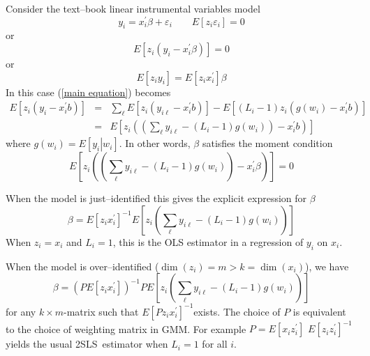 \documentclass[12pt]{article}
\begin{document}
Consider the text--book linear instrumental variables model
\begin{equation*}
y_{i}=x_{i}^{\prime }\beta +\varepsilon _{i}\qquad E\left[ z_{i}\varepsilon
_{i}\right] =0
\end{equation*}%
or%
\begin{equation}
E\left[ z_{i}\left( y_{i}-x_{i}^{\prime }\beta \right) \right] =0
\label{moment condition}
\end{equation}%
or%
\begin{equation*}
E\left[ z_{i}y_{i}\right] =E\left[ z_{i}x_{i}^{\prime }\right] \beta
\end{equation*}%
In this case (\ref{main equation}) becomes%
\begin{eqnarray*}
E\left[ z_{i}\left( y_{i}-x_{i}^{\prime }b\right) \right] &=&\sum_{\ell }E%
\left[ z_{i}\left( y_{i\ell }-x_{i}^{\prime }b\right) \right] -E\left[
\left( L_{i}-1\right) z_{i}\left( g\left( w_{i}\right) -x_{i}^{\prime
}b\right) \right] \\
&=&E\left[ z_{i}\left( \left( \sum_{\ell }y_{i\ell }-\left( L_{i}-1\right)
g\left( w_{i}\right) \right) -x_{i}^{\prime }b\right) \right]
\end{eqnarray*}%
where $g\left( w_{i}\right) =E\left[ \left. y_{i}\right\vert w_{i}\right] $.
In other words, $\beta $ satisfies the moment condition
\begin{equation}
E\left[ z_{i}\left( \left( \sum_{\ell }y_{i\ell }-\left( L_{i}-1\right)
g\left( w_{i}\right) \right) -x_{i}^{\prime }\beta \right) \right] =0
\label{momcon1}
\end{equation}

When the model is just--identified this gives the explicit expression for $%
\beta $%
\begin{equation}
\beta =E\left[ z_{i}x_{i}^{\prime }\right] ^{-1}E\left[ z_{i}\left(
\sum_{\ell }y_{i\ell }-\left( L_{i}-1\right) g\left( w_{i}\right) \right) %
\right]  \label{est1}
\end{equation}%
When $z_{i}=x_{i}$ and $L_{i}=1$, this is the OLS estimator in a regression
of $y_{i}$ on $x_{i}$.

When the model is over--identified ($\dim \left( z_{i}\right) =m>k=\dim
\left( x_{i}\right) $), we have%
\begin{equation}
\beta =\left( PE\left[ z_{i}x_{i}^{\prime }\right] \right) ^{-1}PE\left[
z_{i}\left( \sum_{\ell }y_{i\ell }-\left( L_{i}-1\right) g\left(
w_{i}\right) \right) \right]  \label{est2}
\end{equation}%
for any $k\times m$-matrix such that $E\left[ Pz_{i}x_{i}^{\prime }\right]
^{-1}$exists. The choice of $P$ is equivalent to the choice of weighting
matrix in GMM. For example $P=E\left[ x_{i}z_{i}^{\prime }\right] $ $E\left[
z_{i}z_{i}^{\prime }\right] ^{-1}$ yields the usual 2SLS\ estimator when $%
L_{i}=1$ for all $i$.
\end{document}
